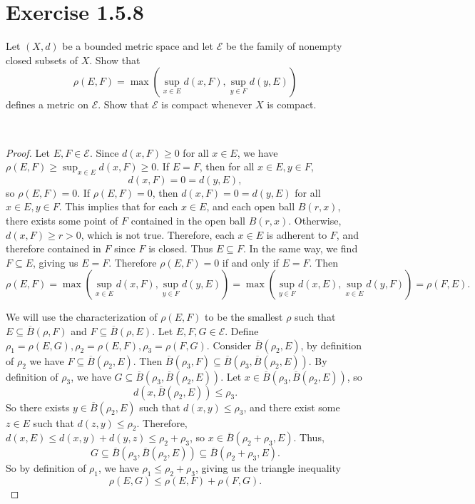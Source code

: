 \documentclass[12pt]{article}
\newenvironment{problem}
    {\begin{lrbox}{\mybox}\begin{minipage}{\textwidth-10pt}}
    {\end{minipage}\end{lrbox}\framebox[6.5in]{\usebox{\mybox}}\\}
\newcommand{\ds}{\displaystyle}
\begin{document}
\newpage
\section*{Exercise 1.5.8}
\begin{problem}
    Let $(X,d)$ be a bounded metric space and let $\mathscr{E}$ be the family of nonempty closed subsets of $X$. Show that
    \[\rho(E,F) = \max\left(\sup_{x\in E}d(x,F),\sup_{y\in F}d(y,E)\right)\]
    defines a metric on $\mathscr{E}$. Show that $\mathscr{E}$ is compact whenever $X$ is compact.
\end{problem}

\begin{proof}
    Let $E,F\in\mathscr{E}$. Since $d(x,F)\geq0$ for all $x\in E$, we have $\ds\rho(E,F) \geq \sup_{x\in E}d(x,F) \geq 0$. If $E=F$, then for all $x\in E, y\in F$,
    \[d(x,F) = 0 = d(y,E),\]
    so $\rho(E,F) = 0$. If $\rho(E,F)=0$, then $d(x,F)=0=d(y,E)$ for all $x\in E, y\in F$. This implies that for each $x\in E$, and each open ball $B(r,x)$, there exists some point of $F$ contained in the open ball $B(r,x)$. Otherwise, $d(x,F)\geq r >0$, which is not true. Therefore, each $x\in E$ is adherent to $F$, and therefore contained in $F$ since $F$ is closed. Thus $E\subseteq F$. In the same way, we find $F\subseteq E$, giving us $E=F$. Therefore $\rho(E,F)=0$ if and only if $E=F$. Then
    \[\rho(E,F) = \max\left(\sup_{x\in E}d(x,F),\sup_{y\in F}d(y,E)\right) = \max\left(\sup_{y\in F}d(x,E),\sup_{x\in E}d(y,F)\right) = \rho(F,E).\]
    
    We will use the characterization of $\rho(E,F)$ to be the smallest $\rho$ such that $E\subseteq \overline{B}(\rho, F)$ and $F\subseteq \overline{B}(\rho, E)$. Let $E,F,G\in\mathscr{E}$. Define $\rho_1=\rho(E,G), \rho_2=\rho(E,F), \rho_3=\rho(F,G)$. Consider $\overline{B}(\rho_2, E)$, by definition of $\rho_2$ we have $F\subseteq\overline{B}(\rho_2, E)$. Then $\overline{B}(\rho_3, F) \subseteq \overline{B}(\rho_3, \overline{B}(\rho_2, E))$. By definition of $\rho_3$, we have $G\subseteq\overline{B}(\rho_3, \overline{B}(\rho_2, E))$. Let $x\in\overline{B}(\rho_3, \overline{B}(\rho_2, E))$, so
    \[d(x,\overline{B}(\rho_2, E)) \leq \rho_3.\]
    So there exists $y\in \overline{B}(\rho_2, E)$ such that $d(x,y) \leq \rho_3$, and there exist some $z\in E$ such that $d(z,y)\leq \rho_2$. Therefore, $d(x,E) \leq d(x,y) + d(y,z) \leq \rho_2 + \rho_3$, so $x\in\overline{B}(\rho_2+\rho_3, E)$. Thus, 
    \[G\subseteq\overline{B}(\rho_3, \overline{B}(\rho_2, E)) \subseteq \overline{B}(\rho_2+\rho_3, E).\]
    So by definition of $\rho_1$, we have $\rho_1 \leq \rho_2+\rho_3$, giving us the triangle inequality
    \[\rho(E,G) \leq \rho(E,F) + \rho(F,G).\]
    
\end{proof}
\end{document}
